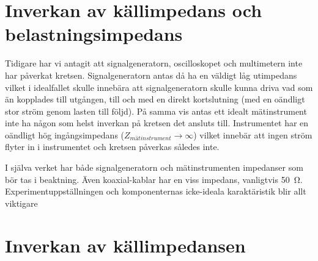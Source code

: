 %
%

\section{Inverkan av källimpedans och belastningsimpedans}\label{impedans}
Tidigare har vi antagit att signalgeneratorn, oscilloskopet och multimetern 
inte har påverkat kretsen. Signalgeneratorn antas då ha en väldigt låg utimpedans
vilket i idealfallet skulle innebära att signalgeneratorn skulle kunna driva 
vad som än kopplades till utgången, till och med en direkt kortslutning (med
en oändligt stor ström genom lasten till följd). På samma vis antas ett idealt
mätinstrument inte ha någon som helst inverkan på kretsen det ansluts till.
Instrumentet har en oändligt hög ingångsimpedans ($Z_{mätinstrument} \to
\infty$) vilket innebär att ingen ström flyter in i instrumentet och kretsen
påverkas således inte.

\par I själva verket har både signalgeneratorn och mätinstrumenten impedanser
som bör tas i beaktning. Även koaxial-kablar har en viss impedans, vanligtvis
\SI{50}{\ohm}. Experimentuppställningen och komponenternas icke-ideala
karaktäristik blir allt viktigare
% 

\section{Inverkan av källimpedansen}\label{Zin}

